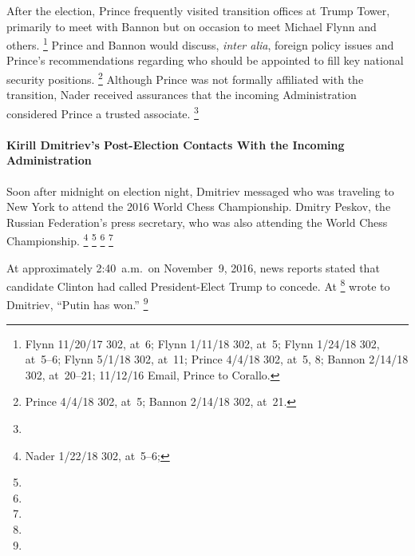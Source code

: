 After the election, Prince frequently visited transition offices at Trump Tower, primarily to meet with Bannon but on occasion to meet Michael Flynn and others.%
\footnote{Flynn 11/20/17 302, at~6;
Flynn 1/11/18 302, at~5;
Flynn 1/24/18 302, at~5--6;
Flynn 5/1/18 302, at~11;
Prince 4/4/18 302, at~5, 8;
Bannon 2/14/18 302, at~20--21;
11/12/16 Email, Prince to Corallo.}
Prince and Bannon would discuss, \textit{inter alia}, foreign policy issues and Prince's recommendations regarding who should be appointed to fill key national security positions.%
\footnote{Prince 4/4/18 302, at~5;
Bannon 2/14/18 302, at~21.}
Although Prince was not formally affiliated with the transition, Nader
received assurances
that the incoming Administration considered Prince a trusted associate.%
\footnote{}

\paragraph{Kirill Dmitriev's Post-Election Contacts With the Incoming Administration}

Soon after midnight on election night, Dmitriev messaged
who was traveling to New York to attend the 2016 World Chess Championship.
Dmitry Peskov, the Russian Federation's press secretary, who was also attending the World Chess Championship.%
\footnote{ Nader 1/22/18 302, at~5--6; }
\footnote{}
\footnote{}
\footnote{}

At approximately 2:40~a.m.\ on November~9, 2016, news reports stated that candidate Clinton had called President-Elect Trump to concede.
At
\footnote{}
wrote to Dmitriev, ``Putin has won.''%
\footnote{}

